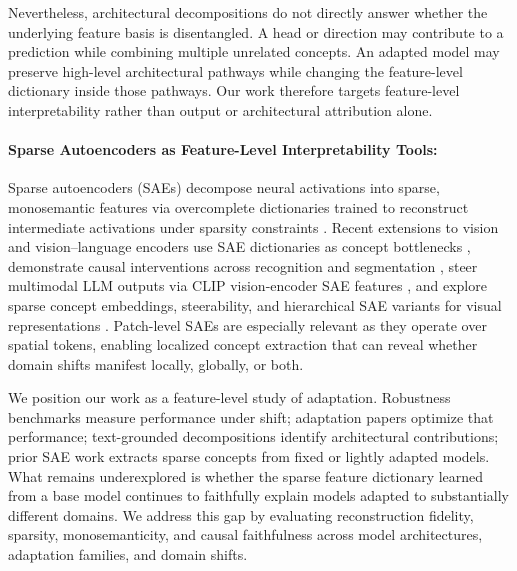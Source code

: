Nevertheless, architectural decompositions do not directly answer whether the underlying feature basis is disentangled. A head or direction may contribute to a prediction while combining multiple unrelated concepts. An adapted model may preserve high-level architectural pathways while changing the feature-level dictionary inside those pathways. Our work therefore targets feature-level interpretability rather than output or architectural attribution alone.

\vspace{-6pt}
\paragraph{Sparse Autoencoders as Feature-Level Interpretability Tools:}
Sparse autoencoders (SAEs) decompose neural activations into sparse, monosemantic features via overcomplete dictionaries trained to reconstruct intermediate activations under sparsity constraints \citep{elhage2022superposition, bricken2023monosemanticity, cunningham2024sparse}. Recent extensions to vision and vision--language encoders use SAE dictionaries as concept bottlenecks \citep{rao2024discover}, demonstrate causal interventions across recognition and segmentation \citep{karvonen2025saevision}, steer multimodal LLM outputs via CLIP vision-encoder SAE features \citep{pach2025monosemantic}, and explore sparse concept embeddings, steerability, and hierarchical SAE variants for visual representations \citep{bhalla2024splice, joseph2025steeringclipsvisiontransformer, zaremba2025msae, bussmann2025matryoshka}. Patch-level SAEs \citep{lim2024patchsae} are especially relevant as they operate over spatial tokens, enabling localized concept extraction that can reveal whether domain shifts manifest locally, globally, or both.

We position our work as a feature-level study of adaptation. Robustness benchmarks measure performance under shift; adaptation papers optimize that performance; text-grounded decompositions identify architectural contributions; prior SAE work extracts sparse concepts from fixed or lightly adapted models. What remains underexplored is whether the sparse feature dictionary learned from a base model continues to faithfully explain models adapted to substantially different domains. We address this gap by evaluating reconstruction fidelity, sparsity, monosemanticity, and causal faithfulness across model architectures, adaptation families, and domain shifts.
